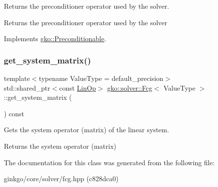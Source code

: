 Returns the preconditioner operator used by the solver. 

\begin{DoxyReturn}{Returns}
the preconditioner operator used by the solver 
\end{DoxyReturn}


Implements \hyperlink{classgko_1_1Preconditionable_ad9545089aef0dfc83bc7a74e5bf1d748}{gko\+::\+Preconditionable}.

\mbox{\label{classgko_1_1solver_1_1Fcg_aae8c67d27df239c18750845275605c87}} 
\subsubsection{\texorpdfstring{get\+\_\+system\+\_\+matrix()}{get\_system\_matrix()}}
{\footnotesize\ttfamily template$<$typename Value\+Type  = default\+\_\+precision$>$ \\
std\+::shared\+\_\+ptr$<$const \hyperlink{classgko_1_1LinOp}{Lin\+Op}$>$ \hyperlink{classgko_1_1solver_1_1Fcg}{gko\+::solver\+::\+Fcg}$<$ Value\+Type $>$\+::get\+\_\+system\+\_\+matrix (\begin{DoxyParamCaption}{ }\end{DoxyParamCaption}) const}



Gets the system operator (matrix) of the linear system. 

\begin{DoxyReturn}{Returns}
the system operator (matrix) 
\end{DoxyReturn}


The documentation for this class was generated from the following file\+:\begin{DoxyCompactItemize}
\item 
ginkgo/core/solver/fcg.\+hpp (c828dca0)\end{DoxyCompactItemize}
